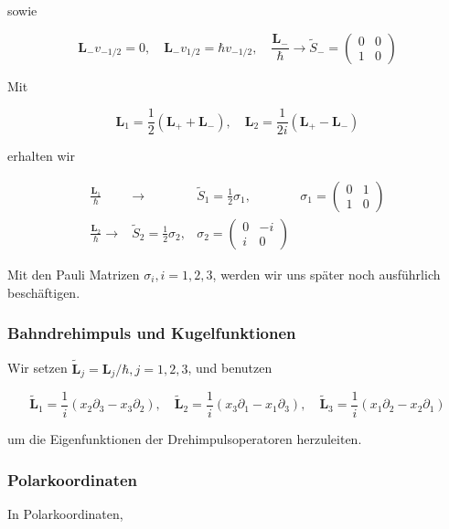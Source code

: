\documentclass[10pt, letterpaper]{article}
\begin{document}
sowie

$$
\mathbf{L}_{-} v_{-1 / 2}=0, \quad \mathbf{L}_{-} v_{1 / 2}=\hbar v_{-1 / 2}, \quad \frac{\mathbf{L}_{-}}{\hbar} \rightarrow \tilde{S}_{-}=\left(\begin{array}{cc}
0 & 0 \\
1 & 0
\end{array}\right)
$$

Mit

$$
\mathbf{L}_{1}=\frac{1}{2}\left(\mathbf{L}_{+}+\mathbf{L}_{-}\right), \quad \mathbf{L}_{2}=\frac{1}{2 i}\left(\mathbf{L}_{+}-\mathbf{L}_{-}\right)
$$

erhalten wir

$$
\begin{array}{rlrl}
\frac{\mathbf{L}_{1}}{\hbar} & \rightarrow & \tilde{S}_{1}=\frac{1}{2} \sigma_{1}, & \sigma_{1}=\left(\begin{array}{cc}
0 & 1 \\
1 & 0
\end{array}\right) \\
\frac{\mathbf{L}_{2}}{\hbar} \rightarrow & \tilde{S}_{2}=\frac{1}{2} \sigma_{2}, & \sigma_{2}=\left(\begin{array}{cc}
0 & -i \\
i & 0
\end{array}\right)
\end{array}
$$

Mit den Pauli Matrizen $\sigma_{i}, i=1,2,3$, werden wir uns später noch ausführlich beschäftigen.

\subsubsection*{Bahndrehimpuls und Kugelfunktionen}
Wir setzen $\tilde{\mathbf{L}}_{j}=\mathbf{L}_{j} / \hbar, j=1,2,3$, und benutzen

$$
\tilde{\mathbf{L}}_{1}=\frac{1}{i}\left(x_{2} \partial_{3}-x_{3} \partial_{2}\right), \quad \tilde{\mathbf{L}}_{2}=\frac{1}{i}\left(x_{3} \partial_{1}-x_{1} \partial_{3}\right), \quad \tilde{\mathbf{L}}_{3}=\frac{1}{i}\left(x_{1} \partial_{2}-x_{2} \partial_{1}\right)
$$

um die Eigenfunktionen der Drehimpulsoperatoren herzuleiten.

\subsubsection*{Polarkoordinaten}
In Polarkoordinaten,
\end{document}
